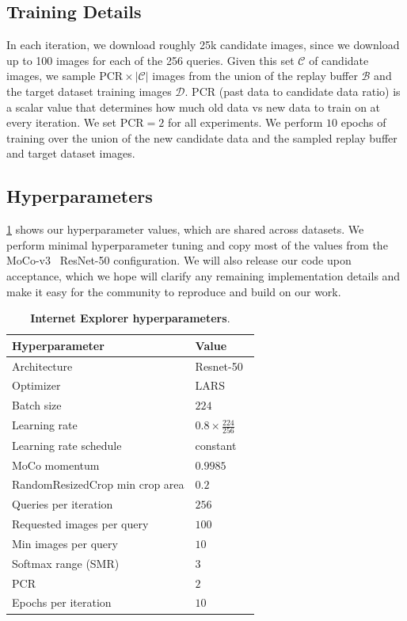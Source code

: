 \subsection{Training Details}
In each iteration, we download roughly 25k candidate images, since we download up to 100 images for each of the 256 queries. Given this set $\mathcal C$ of candidate images, we sample $\text{PCR} \times |\mathcal C|$ images from the union of the replay buffer $\mathcal B$ and the target dataset training images $\mathcal D$. PCR (past data to candidate data ratio) is a scalar value that determines how much old data vs new data to train on at every iteration. We set $\text{PCR}=2$ for all experiments. We perform $10$ epochs of training over the union of the new candidate data and the sampled replay buffer and target dataset images. 

\subsection{Hyperparameters}

\cref{tab:hyperparameters} shows our hyperparameter values, which are shared across datasets. We perform minimal hyperparameter tuning and copy most of the values from the MoCo-v3~\cite{chen2021empirical} ResNet-50 configuration. 
We will also release our code upon acceptance, which we hope will clarify any remaining implementation details and make it easy for the community to reproduce and build on our work. 
\begin{table}
    \centering
    \begin{tabular}{ll}
    \toprule
        Hyperparameter & Value \\
    \midrule
        Architecture & Resnet-50~\cite{he2016deep} \\
        Optimizer & LARS~\cite{you2017large} \\
        Batch size & $224$ \\
        Learning rate & $0.8 \times \frac{224}{256}$ \\
        Learning rate schedule & constant \\
        MoCo momentum & $0.9985$ \\
        RandomResizedCrop min crop area & $0.2$ \\
        Queries per iteration & $256$ \\
        Requested images per query & $100$ \\
        Min images per query & $10$ \\    
        Softmax range (SMR) & $3$ \\
        PCR & $2$ \\
        Epochs per iteration & $10$ \\
    \bottomrule
    \end{tabular}
    \caption{\textbf{Internet Explorer hyperparameters}.}
    \label{tab:hyperparameters}
\end{table}



